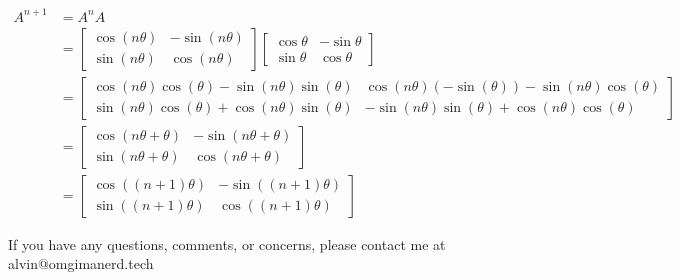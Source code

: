 \documentclass{math}
\begin{document}
\begin{align*}
  A^{n+1} &= A^nA \\
  &= \begin{bmatrix}
    \cos(n\theta) & -\sin(n\theta) \\
    \sin(n\theta) & \cos(n\theta)
  \end{bmatrix}\begin{bmatrix}
    \cos\theta & -\sin\theta \\
    \sin\theta & \cos\theta
  \end{bmatrix} \\
  &= \begin{bmatrix}
    \cos(n\theta)\cos(\theta)-\sin(n\theta)\sin(\theta) &
      \cos(n\theta)(-\sin(\theta))-\sin(n\theta)\cos(\theta) \\
    \sin(n\theta)\cos(\theta)+\cos(n\theta)\sin(\theta) &
      -\sin(n\theta)\sin(\theta)+\cos(n\theta)\cos(\theta)
  \end{bmatrix} \\
  &= \begin{bmatrix}
    \cos(n\theta+\theta) & -\sin(n\theta+\theta) \\
    \sin(n\theta+\theta) & \cos(n\theta+\theta)
  \end{bmatrix} \\
  &= \begin{bmatrix}
    \cos((n+1)\theta) & -\sin((n+1)\theta) \\
    \sin((n+1)\theta) & \cos((n+1)\theta)
  \end{bmatrix}
\end{align*}

\begin{center}
  If you have any questions, comments, or concerns, please contact me at
  alvin@omgimanerd.tech
\end{center}
\end{document}
